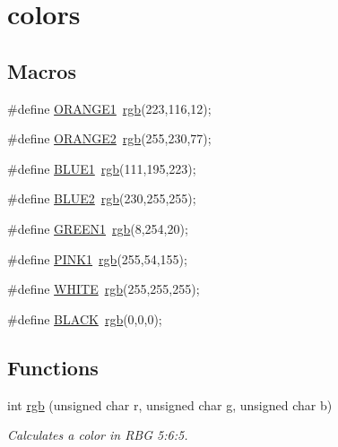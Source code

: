 \hypertarget{group__colors}{}\section{colors}
\label{group__colors}
\subsection*{Macros}
\begin{DoxyCompactItemize}
\item 
\#define \hyperlink{group__colors_gabc93b0adf636edc12e8e9e0489429972}{O\+R\+A\+N\+G\+E1}~\hyperlink{group__colors_ga8ac8469511c64983e8f0a678a14f0e36}{rgb}(223,116,12);
\item 
\#define \hyperlink{group__colors_ga8ac45568d18ed08eb1ff4e9355110f6e}{O\+R\+A\+N\+G\+E2}~\hyperlink{group__colors_ga8ac8469511c64983e8f0a678a14f0e36}{rgb}(255,230,77);
\item 
\#define \hyperlink{group__colors_ga30100d62cd1f80d21430872e1be9c543}{B\+L\+U\+E1}~\hyperlink{group__colors_ga8ac8469511c64983e8f0a678a14f0e36}{rgb}(111,195,223);
\item 
\#define \hyperlink{group__colors_ga741d26513518e80fdef905dc6f209fc8}{B\+L\+U\+E2}~\hyperlink{group__colors_ga8ac8469511c64983e8f0a678a14f0e36}{rgb}(230,255,255);
\item 
\#define \hyperlink{group__colors_ga343686a86fcf4e10a82059b078b1b7d0}{G\+R\+E\+E\+N1}~\hyperlink{group__colors_ga8ac8469511c64983e8f0a678a14f0e36}{rgb}(8,254,20);
\item 
\#define \hyperlink{group__colors_ga0514cf5f3dd5549be9c93c6ec588dbd5}{P\+I\+N\+K1}~\hyperlink{group__colors_ga8ac8469511c64983e8f0a678a14f0e36}{rgb}(255,54,155);
\item 
\#define \hyperlink{group__colors_ga87b537f5fa5c109d3c05c13d6b18f382}{W\+H\+I\+TE}~\hyperlink{group__colors_ga8ac8469511c64983e8f0a678a14f0e36}{rgb}(255,255,255);
\item 
\#define \hyperlink{group__colors_ga7b3b25cba33b07c303f3060fe41887f6}{B\+L\+A\+CK}~\hyperlink{group__colors_ga8ac8469511c64983e8f0a678a14f0e36}{rgb}(0,0,0);
\end{DoxyCompactItemize}
\subsection*{Functions}
\begin{DoxyCompactItemize}
\item 
int \hyperlink{group__colors_ga8ac8469511c64983e8f0a678a14f0e36}{rgb} (unsigned char r, unsigned char g, unsigned char b)
\begin{DoxyCompactList}\small\item\em Calculates a color in R\+BG 5\+:6\+:5. \end{DoxyCompactList}\end{DoxyCompactItemize}


